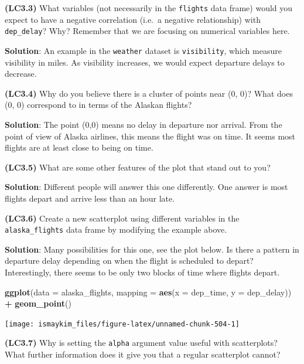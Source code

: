 \documentclass[12pt, krantz2,]{krantz}
\makeatletter
\newenvironment{Shaded}{\begin{snugshade}}{\end{snugshade}}
\newcommand{\DataTypeTok}[1]{\textcolor[rgb]{0.27,0.27,0.27}{#1}}
\newcommand{\KeywordTok}[1]{\textcolor[rgb]{0.27,0.27,0.27}{\textbf{#1}}}
\newcommand{\NormalTok}[1]{#1}
\newcommand{\OperatorTok}[1]{\textcolor[rgb]{0.43,0.43,0.43}{\textbf{#1}}}
\newcommand{\StringTok}[1]{\textcolor[rgb]{0.5,0.5,0.5}{#1}}
\newenvironment{kframe}{%
\medskip{}
\setlength{\fboxsep}{.8em}
 \def\at@end@of@kframe{}%
 \ifinner\ifhmode%
  \def\at@end@of@kframe{\end{minipage}}%
  \begin{minipage}{\columnwidth}%
 \fi\fi%
 \def\FrameCommand##1{\hskip\@totalleftmargin \hskip-\fboxsep
 \colorbox{shadecolor}{##1}\hskip-\fboxsep
     \hskip-\linewidth \hskip-\@totalleftmargin \hskip\columnwidth}%
 \MakeFramed {\advance\hsize-\width
   \@totalleftmargin\z@ \linewidth\hsize
   \@setminipage}}%
 {\par\unskip\endMakeFramed%
 \at@end@of@kframe}
\renewenvironment{Shaded}{\begin{kframe}}{\end{kframe}}
\makeatother
\begin{document}
\textbf{(LC3.3)} What variables (not necessarily in the \texttt{flights} data frame) would you expect to have a negative correlation (i.e.~a negative relationship) with \texttt{dep\_delay}? Why? Remember that we are focusing on numerical variables here.

\textbf{Solution}: An example in the \texttt{weather} dataset is \texttt{visibility}, which measure visibility in miles. As visibility increases, we would expect departure delays to decrease.

\textbf{(LC3.4)} Why do you believe there is a cluster of points near (0, 0)? What does (0, 0) correspond to in terms of the Alaskan flights?

\textbf{Solution}: The point (0,0) means no delay in departure nor arrival. From the point of view of Alaska airlines, this means the flight was on time. It seems most flights are at least close to being on time.

\textbf{(LC3.5)} What are some other features of the plot that stand out to you?

\textbf{Solution}: Different people will answer this one differently. One answer is most flights depart and arrive less than an hour late.

\textbf{(LC3.6)} Create a new scatterplot using different variables in the \texttt{alaska\_flights} data frame by modifying the example above.

\textbf{Solution}: Many possibilities for this one, see the plot below. Is there a pattern in departure delay depending on when the flight is scheduled to depart? Interestingly, there seems to be only two blocks of time where flights depart.

\begin{Shaded}
\begin{Highlighting}[]
\KeywordTok{ggplot}\NormalTok{(}\DataTypeTok{data =}\NormalTok{ alaska_flights, }\DataTypeTok{mapping =} \KeywordTok{aes}\NormalTok{(}\DataTypeTok{x =}\NormalTok{ dep_time, }\DataTypeTok{y =}\NormalTok{ dep_delay)) }\OperatorTok{+}
\StringTok{  }\KeywordTok{geom_point}\NormalTok{()}
\end{Highlighting}
\end{Shaded}

\begin{center}\texttt{[image: ismaykim\_files/figure-latex/unnamed-chunk-504-1]} \end{center}

\textbf{(LC3.7)} Why is setting the \texttt{alpha} argument value useful with scatterplots? What further information does it give you that a regular scatterplot cannot?
\end{document}
